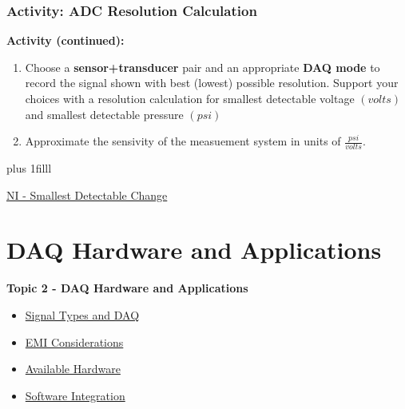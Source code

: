 \documentclass[fleqn]{beamer} %
\newcommand{\sectionIItitle}{DAQ Hardware and Applications}
\newcommand{\sectionIsubsectionIVtitle}{Activity: ADC Resolution Calculation}
\newcommand{\sectionIIsubsectionItitle}{Signal Types and DAQ}
\newcommand{\sectionIIsubsectionIItitle}{EMI Considerations}
\newcommand{\sectionIIsubsectionIIItitle}{Available Hardware}
\newcommand{\sectionIIsubsectionIVtitle}{Software Integration}
\newcommand{\btVFill}{\vskip0pt plus 1filll}
\begin{document}
			\begin{frame}
				\frametitle{\sectionIsubsectionIVtitle} \scriptsize

				\bigskip

				\textbf{Activity (continued):} 
					
				\begin{enumerate}
					
					\item Choose a {\bf sensor+transducer} pair and an appropriate {\bf DAQ mode} to record the signal shown with best (lowest) possible resolution. Support your choices with a resolution calculation for smallest detectable voltage $(volts)$ and smallest detectable pressure $(psi)$ \vspace{10mm}\\

					\item Approximate the sensivity of the measuement system in units of $\frac{psi}{volts}$. 

			
		
				\end{enumerate}	



				\btVFill
	
				{\tiny \href{https://www.ni.com/docs/en-US/bundle/daqhelp/page/codewidth.html}{NI - Smallest Detectable Change}}
										
			\end{frame}

	
	\section{\sectionIItitle}\label{sectionII}

		\begin{frame}
			\large \textbf{Topic 2 - \sectionIItitle} \vspace{3mm}\\

			\begin{itemize}
				\item \hyperlink{sectionIIsubsectionI}{\sectionIIsubsectionItitle} \vspc %
				\item \hyperlink{sectionIIsubsectionII}{\sectionIIsubsectionIItitle} \vspc %
				\item \hyperlink{sectionIIsubsectionIII}{\sectionIIsubsectionIIItitle} \vspc %
				\item \hyperlink{sectionIIsubsectionIV}{\sectionIIsubsectionIVtitle} \vspc %
			\end{itemize}

		\end{frame}
\end{document}
